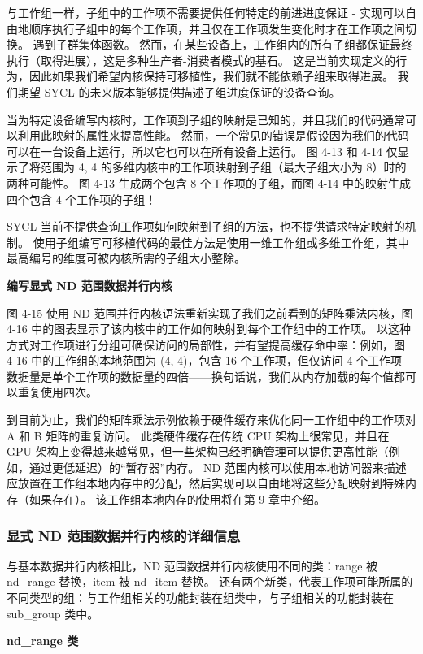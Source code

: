 与工作组一样，子组中的工作项不需要提供任何特定的前进进度保证 - 实现可以自由地顺序执行子组中的每个工作项，并且仅在工作项发生变化时才在工作项之间切换。 遇到子群集体函数。 然而，在某些设备上，工作组内的所有子组都保证最终执行（取得进展），这是多种生产者-消费者模式的基石。 这是当前实现定义的行为，因此如果我们希望内核保持可移植性，我们就不能依赖子组来取得进展。 我们期望 SYCL 的未来版本能够提供描述子组进度保证的设备查询。

当为特定设备编写内核时，工作项到子组的映射是已知的，并且我们的代码通常可以利用此映射的属性来提高性能。 然而，一个常见的错误是假设因为我们的代码可以在一台设备上运行，所以它也可以在所有设备上运行。 图 4-13 和 4-14 仅显示了将范围为 {4, 4} 的多维内核中的工作项映射到子组（最大子组大小为 8）时的两种可能性。 图 4-13 生成两个包含 8 个工作项的子组，而图 4-14 中的映射生成四个包含 4 个工作项的子组！

SYCL 当前不提供查询工作项如何映射到子组的方法，也不提供请求特定映射的机制。 使用子组编写可移植代码的最佳方法是使用一维工作组或多维工作组，其中最高编号的维度可被内核所需的子组大小整除。

\textbf{编写显式 ND 范围数据并行内核}

图 4-15 使用 ND 范围并行内核语法重新实现了我们之前看到的矩阵乘法内核，图 4-16 中的图表显示了该内核中的工作如何映射到每个工作组中的工作项。 以这种方式对工作项进行分组可确保访问的局部性，并有望提高缓存命中率：例如，图 4-16 中的工作组的本地范围为 (4, 4)，包含 16 个工作项，但仅访问 4 个工作项 数据量是单个工作项的数据量的四倍——换句话说，我们从内存加载的每个值都可以重复使用四次。

到目前为止，我们的矩阵乘法示例依赖于硬件缓存来优化同一工作组中的工作项对 A 和 B 矩阵的重复访问。 此类硬件缓存在传统 CPU 架构上很常见，并且在 GPU 架构上变得越来越常见，但一些架构已经明确管理可以提供更高性能（例如，通过更低延迟）的“暂存器”内存。 ND 范围内核可以使用本地访问器来描述应放置在工作组本地内存中的分配，然后实现可以自由地将这些分配映射到特殊内存（如果存在）。 该工作组本地内存的使用将在第 9 章中介绍。

\subsubsection{显式 ND 范围数据并行内核的详细信息}
与基本数据并行内核相比，ND 范围数据并行内核使用不同的类：range 被 nd\_range 替换，item 被 nd\_item 替换。 还有两个新类，代表工作项可能所属的不同类型的组：与工作组相关的功能封装在组类中，与子组相关的功能封装在 sub\_group 类中。

\textbf{nd\_range 类}

